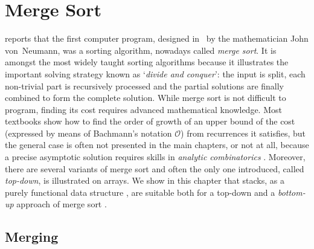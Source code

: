 \chapter{Merge Sort}
\label{chap:merge_sort}

\cite{Knuth_1996} reports that the first computer program, designed
in~ by the mathematician John von~Neumann, was a
sorting algorithm, nowadays called \emph{merge sort}. It is amongst
the most widely taught sorting algorithms because it illustrates the
important solving strategy known as `\emph{divide and
  conquer}': the input is split, each
non\hyp{}trivial part is recursively processed and the partial
solutions are finally combined to form the complete solution.  While
merge sort is not difficult to program, finding its cost requires
advanced mathematical knowledge. Most
textbooks \citep{GrahamKnuthPatashnik_1994,CLRS_2009} show how to find
the order of growth of an upper bound of the cost (expressed by means
of Bachmann's notation \(\mathcal{O}\)) from recurrences it satisfies,
but the general case is often not presented in the main chapters, or
not at all, because a precise asymptotic solution requires skills in
\emph{analytic combinatorics} \citep{FlajoletSedgewick_2001,
  FlajoletSedgewick_2009, FlajoletGolin_1994, Hwang_1998,
  ChenHwangChen_1999}. Moreover, there are several variants of merge
sort \citep{Knuth_1998,GolinSedgewick_1993} and often the only one
introduced, called \emph{top\hyp{}down}, is illustrated on arrays. We
show in this chapter that stacks, as a purely functional data
structure \citep{Okasaki_1998b}, are suitable both for a top\hyp{}down
and a \emph{bottom\hyp{}up} approach of merge
sort \citep{PannyProdinger_1995}.


\section{Merging}
\label{sec:merging}


